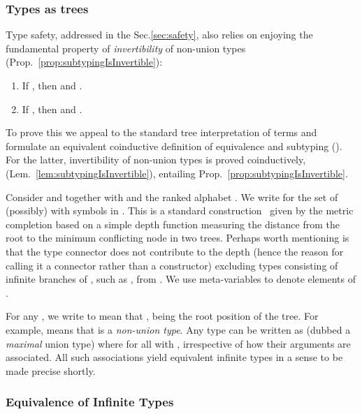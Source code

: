\subsubsection{Types as trees}
\label{sec:typingCoinductive}


Type safety, addressed in the Sec.\ref{sec:safety}, also relies on 
enjoying the fundamental property of \emph{invertibility} of non-union types
(\cf Prop.~\ref{prop:subtypingIsInvertible}):
\begin{enumerate}
  \item If , then  and .
  \item If , then  and .
\end{enumerate}


To prove this we appeal to the standard tree interpretation of terms and
formulate an equivalent coinductive definition of equivalence and subtyping
(). For the latter, invertibility of non-union types is proved
coinductively, (Lem.~\ref{lem:subtypingIsInvertible}), entailing Prop.~\ref{prop:subtypingIsInvertible}.

Consider   and  together
with   and the ranked alphabet
.  We write  for
the set of (possibly)  with symbols in .
This is a standard construction~\cite{terese03,journals/tcs/Courcelle83} given
by the metric completion based on a simple depth function measuring the
distance from the root to the minimum conflicting node in two trees.
Perhaps worth mentioning is that the type connector  does not
contribute to the depth (hence the reason for calling it a connector rather
than a constructor) excluding types consisting of infinite branches of
, such as ,
from . We use meta-variables  to denote elements of
.

\begin{remark}
\label{rem:maximalUnionTypes}
For any , we write  to mean that
,  being the root position of the tree. For
example,  means that  is a \emph{non-union type}. Any
type  can be written as  (dubbed a
\emph{maximal} union type) where  for all 
with , irrespective of how their arguments are associated. All
such associations yield equivalent infinite types in a sense to be made precise
shortly.
\end{remark}




\subsubsection{Equivalence of Infinite Types}


